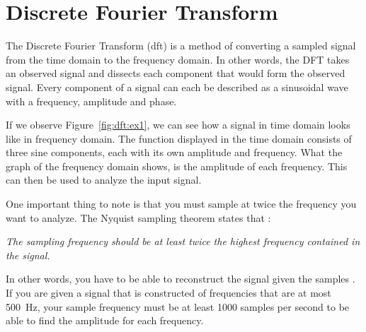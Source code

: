 \section{Discrete Fourier Transform}\label{ch:dft}
The Discrete Fourier Transform (\gls{dft}) is a method of converting a sampled signal from the time domain to the frequency domain. In other words, the DFT takes an observed signal and dissects each component that would form the observed signal. Every component of a signal can each be described as a sinusoidal wave with a frequency, amplitude and phase.

If we observe Figure~\ref{fig:dft:ex1}, we can see how a signal in time domain looks like in frequency domain. The function displayed in the time domain consists of three sine components, each with its own amplitude and frequency. What the graph of the frequency domain shows, is the amplitude of each frequency. This can then be used to analyze the input signal.

One important thing to note is that you must sample at twice the frequency you want to analyze. The Nyquist sampling theorem states that \cite{signal:aliasing}:
\begin{center}
    \textit{The sampling frequency should be at least twice the highest frequency contained in the signal.}
\end{center}
In other words, you have to be able to reconstruct the signal given the samples \cite[Ch~3]{smith1997scientist}. If you are given a signal that is constructed of frequencies that are at most 500~Hz, your sample frequency must be at least 1000 samples per second to be able to find the amplitude for each frequency.

